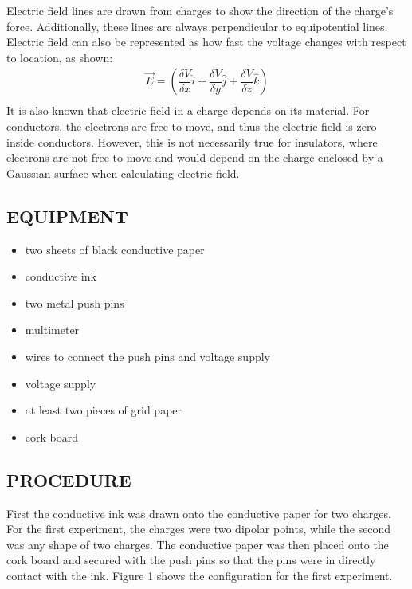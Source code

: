 \documentclass [12pt, letterpaper, twoside] {article}
\begin{document}
Electric field lines are drawn from charges to show the direction of the charge's force. Additionally, these lines are always perpendicular to equipotential lines.
Electric field can also be represented as how fast the voltage changes with respect to location, as shown:
\begin{equation}
  \begin{split}
    \vec{E} = \left(\dfrac{\delta{V}}{\delta{x}}\hat{i} + \dfrac{\delta{V}}{\delta{y}}\hat{j} + \dfrac{\delta{V}}{\delta{z}}\hat{k}\right) \\
  \end{split}
\end{equation}
It is also known that electric field in a charge depends on its material. For conductors, the electrons are free to move, and thus the electric field is zero inside conductors. However, this is not necessarily true for insulators, where electrons are not free to move and would depend on the charge enclosed by a Gaussian surface when calculating electric field.

\subsection* {EQUIPMENT}
  \noindent
  \begin {itemize}
    \itemsep0em
    \item {two sheets of black conductive paper}
    \item {conductive ink}
    \item {two metal push pins}
    \item {multimeter}
    \item {wires to connect the push pins and voltage supply}
    \item {voltage supply}
    \item {at least two pieces of grid paper}
    \item {cork board}
  \end {itemize}

\subsection* {PROCEDURE}
First the conductive ink was drawn onto the conductive paper for two charges. For the first experiment, the charges were two dipolar points, while the second was any shape of two charges. The conductive paper was then placed onto the cork board and secured with the push pins so that the pins were in directly contact with the ink. Figure 1 shows the configuration for the first experiment.
\end{document}
